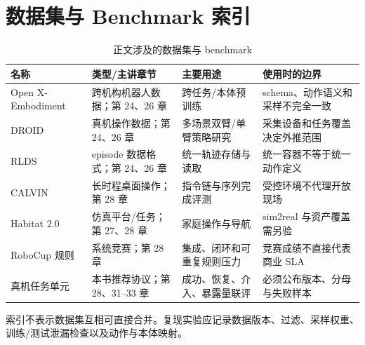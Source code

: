 \chapter{数据集与 Benchmark 索引}
\label{app:datasets-benchmarks}

\begin{table}[H]
\begingroup{}
\centering\small
\caption{正文涉及的数据集与 benchmark}
\label{tab:dataset-benchmark-index}
\begin{tabularx}{\textwidth}{p{}p{}YY}
\toprule
名称 & 类型/主讲章节 & 主要用途 & 使用时的边界 \\
\midrule
Open X-Embodiment & 跨机构机器人数据；第 24、26 章 & 跨任务/本体预训练 & schema、动作语义和采样不完全一致 \\
DROID & 真机操作数据；第 24、26 章 & 多场景双臂/单臂策略研究 & 采集设备和任务覆盖决定外推范围 \\
RLDS & episode 数据格式；第 24、26 章 & 统一轨迹存储与读取 & 统一容器不等于统一动作定义 \\
CALVIN & 长时程桌面操作；第 28 章 & 指令链与序列完成评测 & 受控环境不代理开放现场 \\
Habitat 2.0 & 仿真平台/任务；第 27、28 章 & 家庭操作与导航 & sim2real 与资产覆盖需另验 \\
RoboCup 规则 & 系统竞赛；第 28 章 & 集成、闭环和可重复规则压力 & 竞赛成绩不直接代表商业 SLA \\
真机任务单元 & 本书推荐协议；第 28、31--33 章 & 成功、恢复、介入、暴露量联评 & 必须公布版本、分母与失败样本 \\
\bottomrule
\end{tabularx}
\endgroup
\end{table}

索引不表示数据集互相可直接合并。复现实验应记录数据版本、过滤、采样权重、训练/测试泄漏检查以及动作与本体映射。

